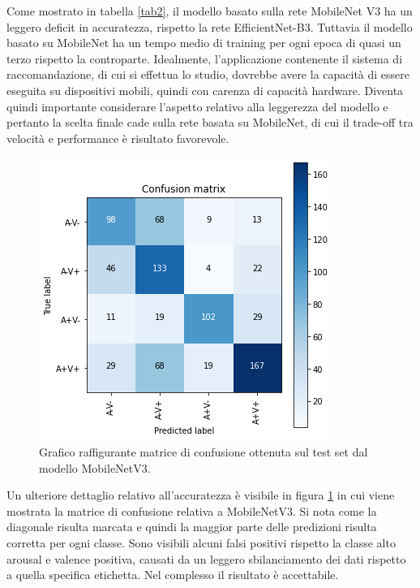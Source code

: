 \documentclass[11pt]{report}
\begin{document}
\vspace{1cm}

Come mostrato in tabella \ref{tab2}, il modello basato sulla rete MobileNet V3 ha un leggero deficit in accuratezza, rispetto la rete EfficientNet-B3. Tuttavia il modello basato su MobileNet ha un tempo medio di training per ogni epoca di quasi un terzo rispetto la controparte. Idealmente, l'applicazione contenente il sistema di raccomandazione, di cui si effettua lo studio, dovrebbe avere la capacità di essere eseguita su dispositivi mobili, quindi con carenza di capacità hardware. Diventa quindi importante considerare l'aspetto relativo alla leggerezza del modello e pertanto la scelta finale cade sulla rete basata su MobileNet, di cui il trade-off tra velocità e performance è risultato favorevole. 




\begin{figure}[h]
    \centering
    \includegraphics[scale=0.65]{img/CM-MobileNet.png}
    \caption{Grafico raffigurante matrice di confusione ottenuta sul test set dal modello MobileNetV3.}
    \label{fig:cnn-cm}
\end{figure}


Un ulteriore dettaglio relativo all'accuratezza è visibile in figura \ref{fig:cnn-cm} in cui viene mostrata la matrice di confusione relativa a MobileNetV3. Si nota come la diagonale risulta marcata e quindi la maggior parte delle predizioni risulta corretta per ogni classe. Sono visibili alcuni falsi positivi rispetto la classe alto arousal e valence positiva, causati da un leggero sbilanciamento dei dati rispetto a quella specifica etichetta. Nel complesso il risultato è accettabile.
\end{document}
